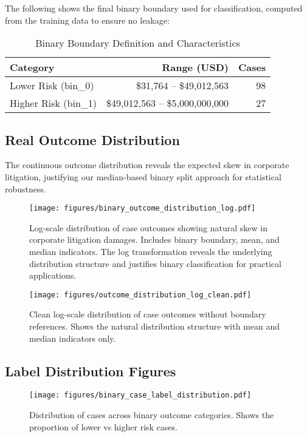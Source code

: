 \documentclass[11pt,a4paper]{article}
\begin{document}
The following shows the final binary boundary used for classification, computed from the training data to ensure no leakage:

\begin{table}[H]
\centering
\caption{Binary Boundary Definition and Characteristics}
\begin{tabular}{lrr}
\toprule
\textbf{Category} & \textbf{Range (USD)} & \textbf{Cases} \\
\midrule
Lower Risk (bin\_0) & \$31,764 -- \$49,012,563 & 98 \\
Higher Risk (bin\_1) & \$49,012,563 -- \$5,000,000,000 & 27 \\
\bottomrule
\end{tabular}
\end{table}

\subsection{Real Outcome Distribution}

The continuous outcome distribution reveals the expected skew in corporate litigation, justifying our median-based binary split approach for statistical robustness.

\begin{figure}[H]
\centering
\texttt{[image: figures/binary\_outcome\_distribution\_log.pdf]}
\caption{Log-scale distribution of case outcomes showing natural skew in corporate litigation damages. Includes binary boundary, mean, and median indicators. The log transformation reveals the underlying distribution structure and justifies binary classification for practical applications.}
\end{figure}

\begin{figure}[H]
\centering
\texttt{[image: figures/outcome\_distribution\_log\_clean.pdf]}
\caption{Clean log-scale distribution of case outcomes without boundary references. Shows the natural distribution structure with mean and median indicators only.}
\end{figure}

\subsection{Label Distribution Figures}

\begin{figure}[H]
\centering
\texttt{[image: figures/binary\_case\_label\_distribution.pdf]}
\caption{Distribution of cases across binary outcome categories. Shows the proportion of lower vs higher risk cases.}
\end{figure}
\end{document}

